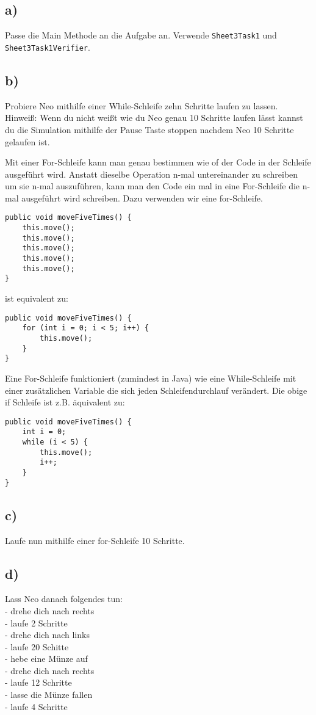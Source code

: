 \subsection*{a)}
	Passe die Main Methode an die Aufgabe an. Verwende \lstinline{Sheet3Task1} und \lstinline{Sheet3Task1Verifier}.
\subsection*{b)}
	Probiere Neo mithilfe einer While-Schleife zehn Schritte laufen zu lassen.\\
	Hinweiß: Wenn du nicht weißt wie du Neo genau 10 Schritte laufen lässt kannst du die Simulation mithilfe der Pause Taste stoppen nachdem Neo 10 Schritte gelaufen ist.

\begin{Infobox}
		Mit einer For-Schleife kann man genau bestimmen wie of der Code in der Schleife ausgeführt wird.
		Anstatt dieselbe Operation n-mal untereinander zu schreiben um sie n-mal auszuführen, kann man den Code ein mal in eine For-Schleife die n-mal ausgeführt wird schreiben.
		Dazu verwenden wir eine for-Schleife. 
		\begin{lstlisting}
public void moveFiveTimes() {
	this.move();
	this.move();
	this.move();
	this.move();
	this.move();
}
		\end{lstlisting}
		ist equivalent zu:
		\begin{lstlisting}
public void moveFiveTimes() {
	for (int i = 0; i < 5; i++) {
		this.move();
	}
}
		\end{lstlisting}
Eine For-Schleife funktioniert (zumindest in Java) wie eine While-Schleife mit einer zusätzlichen Variable die sich jeden Schleifendurchlauf verändert.
Die obige if Schleife ist z.B. äquivalent zu:
		\begin{lstlisting}
public void moveFiveTimes() {
	int i = 0;
	while (i < 5) {
		this.move();
		i++;
	}
}
		\end{lstlisting}
 \end{Infobox}

\subsection*{c)}
Laufe nun mithilfe einer for-Schleife 10 Schritte.

\subsection*{d)}
Lass Neo danach folgendes tun:\\
	- drehe dich nach rechts\\
	- laufe 2 Schritte\\
	- drehe dich nach links\\ 
	- laufe 20 Schitte\\
	- hebe eine Münze auf\\
	- drehe dich nach rechts\\
	- laufe 12 Schritte\\
	- lasse die Münze fallen\\
	- laufe 4 Schritte


